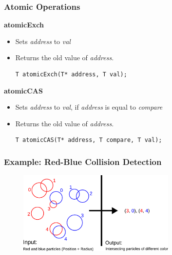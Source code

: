 \documentclass[aspectratio=169,handout]{beamer}
\begin{document}
\begin{frame}[fragile]
\frametitle{Atomic Operations}

\textbf{atomicExch}
\begin{itemize}
	\item Sets \textit{address} to \textit{val}
	\item Returns the old value of \textit{address}.
\begin{lstlisting}
T atomicExch(T* address, T val);
\end{lstlisting}
\end{itemize}

\textbf{atomicCAS}
\begin{itemize}
	\item Sets \textit{address} to \textit{val}, if \textit{address} is equal to \textit{compare}
	\item Returns the old value of \textit{address}.
\begin{lstlisting}
T atomicCAS(T* address, T compare, T val);
\end{lstlisting}
\end{itemize}
\end{frame}

\frame
{
	\frametitle{Example: Red-Blue Collision Detection}
	\begin{figure}
		\includegraphics[width=0.7\textwidth]{red_blue_particles}
	\end{figure}
}
\end{document}
